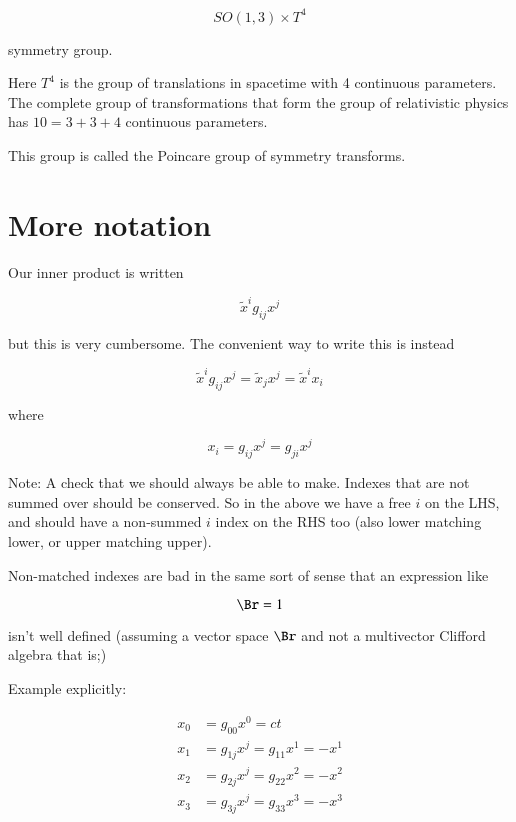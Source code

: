 \begin{equation*}
SO(1,3) \times T^4
\end{equation*}

symmetry group.

Here $T^4$ is the group of translations in spacetime with 4 continuous parameters.   The complete group of transformations that form the group of relativistic physics has $10 = 3 + 3 + 4$ continuous parameters.

This group is called the Poincare group of symmetry transforms.

\section{More notation}

Our inner product is written

\begin{equation}\label{eqn:relativisticElectrodynamicsL6:150}
\tilde{x}^i g_{ij} x^j
\end{equation}

but this is very cumbersome.  The convenient way to write this is instead

\begin{equation}\label{eqn:relativisticElectrodynamicsL6:160}
\tilde{x}^i g_{ij} x^j = \tilde{x}_j x^j = \tilde{x}^i x_i
\end{equation}

where 

\begin{equation}\label{eqn:relativisticElectrodynamicsL6:170}
x_i = g_{ij} x^j = g_{ji} x^j
\end{equation}

Note: A check that we should always be able to make.  Indexes that are not summed over should be conserved.  So in the above we have a free $i$ on the LHS, and should have a non-summed $i$ index on the RHS too (also lower matching lower, or upper matching upper).

Non-matched indexes are bad in the same sort of sense that an expression like

\begin{equation}\label{eqn:relativisticElectrodynamicsL6:180}
\Br = 1
\end{equation}

isn't well defined (assuming a vector space $\Br$ and not a multivector Clifford algebra that is;)

Example explicitly:

\begin{align*}
x_0 &= g_{0 0} x^0 = ct  \\
x_1 &= g_{1 j} x^j = g_{11} x^1 = -x^1 \\
x_2 &= g_{2 j} x^j = g_{22} x^2 = -x^2 \\
x_3 &= g_{3 j} x^j = g_{33} x^3 = -x^3
\end{align*}

